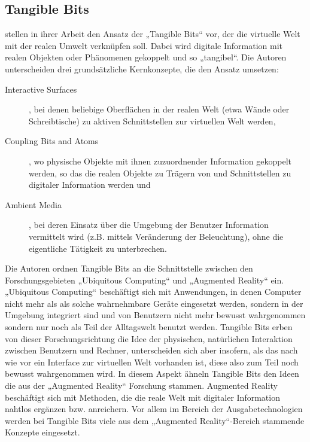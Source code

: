 
\subsection{Tangible Bits}
\label{sub:tangible_bits}

\citet{Ishii97} stellen in ihrer Arbeit den Ansatz der „Tangible Bits“ vor, der die virtuelle Welt mit der realen Umwelt verknüpfen soll. Dabei wird digitale Information mit realen Objekten oder Phänomenen gekoppelt und so „tangibel“. Die Autoren unterscheiden drei grundsätzliche Kernkonzepte, die den Ansatz umsetzen:
\begin{description}
	\item[Interactive Surfaces], bei denen beliebige Oberflächen in der realen Welt (etwa Wände oder Schreibtische) zu aktiven Schnittstellen zur virtuellen Welt werden,
	\item[Coupling Bits and Atoms], wo physische Objekte mit ihnen zuzuordnender Information gekoppelt werden, so das die realen Objekte zu Trägern von und Schnittstellen zu digitaler Information werden und
	\item[Ambient Media], bei deren Einsatz über die Umgebung der Benutzer Information vermittelt wird (z.B. mittels Veränderung der Beleuchtung), ohne die eigentliche Tätigkeit zu unterbrechen. 
\end{description}

Die Autoren ordnen Tangible Bits an die Schnittstelle zwischen den Forschungsgebieten „Ubiquitous Computing“ und „Augmented Reality“ ein. „Ubiquitous Computing“ \citep{Weiser91} beschäftigt sich mit Anwendungen, in denen Computer nicht mehr als als solche wahrnehmbare Geräte eingesetzt werden, sondern in der Umgebung integriert sind und von Benutzern nicht mehr bewusst wahrgenommen sondern nur noch als Teil der Alltagswelt benutzt werden. Tangible Bits erben von dieser Forschungsrichtung die Idee der physischen, natürlichen Interaktion zwischen Benutzern und Rechner, unterscheiden sich aber insofern, als das nach wie vor ein Interface zur virtuellen Welt vorhanden ist, diese also zum Teil noch bewusst wahrgenommen wird. In diesem Aspekt ähneln Tangible Bits den Ideen die aus der „Augmented Reality“ Forschung stammen. Augmented Reality beschäftigt sich mit Methoden, die die reale Welt mit digitaler Information nahtlos ergänzen bzw. anreichern. Vor allem im Bereich der Ausgabetechnologien werden bei Tangible Bits viele aus dem „Augmented Reality“-Bereich stammende Konzepte eingesetzt.

